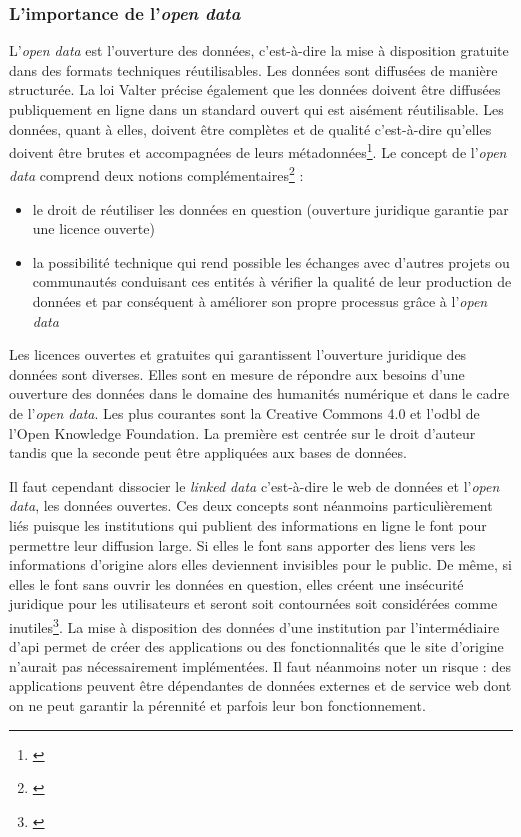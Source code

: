 \documentclass[a4paper, 12pt, twoside]{book}
\begin{document}
\subsubsection{L'importance de l'\textit{open data}}
L'\textit{open data} est l'ouverture des données, c'est-à-dire la mise à disposition gratuite dans des formats techniques réutilisables. Les données sont diffusées de manière structurée. La loi Valter précise également que les données doivent être diffusées publiquement en ligne dans un standard ouvert qui est aisément réutilisable. Les données, quant à elles, doivent être complètes et de qualité c'est-à-dire qu'elles doivent être brutes et accompagnées de leurs métadonnées\footnote{\cite{castets-renard_open_2016}}. 
Le concept de l'\textit{open data} comprend deux notions complémentaires\footnote{\cite{wenz_lopen_2016}} :
\begin{itemize}
    \item le droit de réutiliser les données en question (ouverture juridique garantie par une licence ouverte)
    \item la possibilité technique qui rend possible les échanges avec d'autres projets ou communautés conduisant ces entités à vérifier la qualité de leur production de données et par conséquent à améliorer son propre processus grâce à l'\textit{open data}
\end{itemize}
Les licences ouvertes et gratuites qui garantissent l'ouverture juridique des données sont diverses. Elles sont en mesure de répondre aux besoins d'une ouverture des données dans le domaine des humanités numérique et dans le cadre de l'\textit{open data}. Les plus courantes sont la Creative Commons 4.0 et l'\gls{odbl} de l'Open Knowledge Foundation. La première est centrée sur le droit d'auteur tandis que la seconde peut être appliquées aux bases de données.

Il faut cependant dissocier le \textit{linked data} c'est-à-dire le web de données et l'\textit{open data}, les données ouvertes. Ces deux concepts sont néanmoins particulièrement liés puisque les institutions qui publient des informations en ligne le font pour permettre leur diffusion large. Si elles le font sans apporter des liens vers les informations d'origine alors elles deviennent invisibles pour le public. De même, si elles le font sans ouvrir les données en question, elles créent une insécurité juridique pour les utilisateurs et seront soit contournées soit considérées comme inutiles\footnote{\cite{wenz_lopen_2016}}.
La mise à disposition des données d'une institution par l'intermédiaire d'\gls{api} permet de créer des applications ou des fonctionnalités que le site d'origine n'aurait pas nécessairement implémentées. Il faut néanmoins noter un risque : des applications peuvent être dépendantes de données externes et de service web dont on ne peut garantir la pérennité et parfois leur bon fonctionnement.
\end{document}
